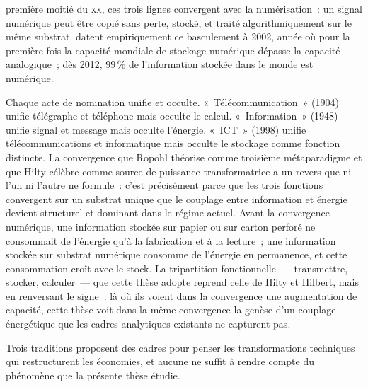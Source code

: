 première moitié du \textsc{xx}\ieme{}, ces trois lignes convergent avec la numérisation~: un signal numérique peut être copié sans perte, stocké, et traité algorithmiquement sur le même substrat. \textcite{hilbert_worlds_2011} datent empiriquement ce basculement à 2002, année où pour la première fois la capacité mondiale de stockage numérique dépasse la capacité analogique~; dès 2012, 99\,\% de l'information stockée dans le monde est numérique.

Chaque acte de nomination unifie et occulte. «~Télécommunication~» (1904) unifie télégraphe et téléphone mais occulte le calcul. «~Information~» (1948) unifie signal et message mais occulte l'énergie. «~ICT~» (1998) unifie télécommunications et informatique mais occulte le stockage comme fonction distincte. La convergence que Ropohl théorise comme troisième métaparadigme et que Hilty célèbre comme source de puissance transformatrice a un revers que ni l'un ni l'autre ne formule~: c'est précisément parce que les trois fonctions convergent sur un substrat unique que le couplage entre information et énergie devient structurel et dominant dans le régime actuel. Avant la convergence numérique, une information stockée sur papier ou sur carton perforé ne consommait de l'énergie qu'à la fabrication et à la lecture~; une information stockée sur substrat numérique consomme de l'énergie en permanence, et cette consommation croît avec le stock. La tripartition fonctionnelle~--- transmettre, stocker, calculer~--- que cette thèse adopte reprend celle de Hilty et Hilbert, mais en renversant le signe~: là où ils voient dans la convergence une augmentation de capacité, cette thèse voit dans la même convergence la genèse d'un couplage énergétique que les cadres analytiques existants ne capturent pas.

Trois traditions proposent des cadres pour penser les transformations techniques qui restructurent les économies, et aucune ne suffit à rendre compte du phénomène que la présente thèse étudie.

